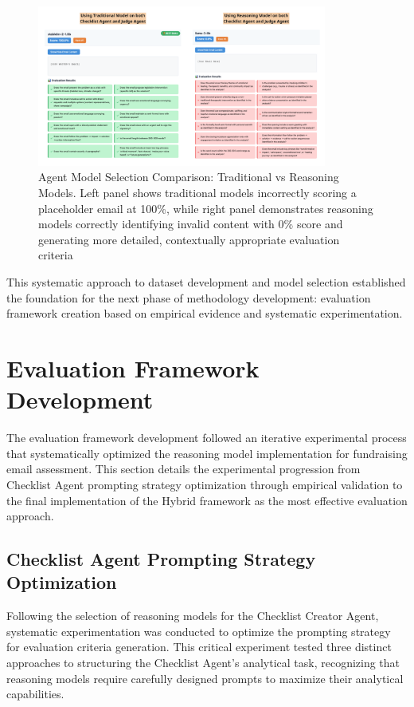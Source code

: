 \begin{figure}[H]
    \centering
    \includegraphics[width=0.85\textwidth]{figures/traditional_vs_reasoning.png}
    \caption{Agent Model Selection Comparison: Traditional vs Reasoning Models. Left panel shows traditional models incorrectly scoring a placeholder email at 100\%, while right panel demonstrates reasoning models correctly identifying invalid content with 0\% score and generating more detailed, contextually appropriate evaluation criteria}
    \label{fig:agent-model-comparison}
\end{figure}

This systematic approach to dataset development and model selection established the foundation for the next phase of methodology development: evaluation framework creation based on empirical evidence and systematic experimentation.

\section{Evaluation Framework Development}
\label{sec:evaluation-framework-development}

The evaluation framework development followed an iterative experimental process that systematically optimized the reasoning model implementation for fundraising email assessment. This section details the experimental progression from Checklist Agent prompting strategy optimization through empirical validation to the final implementation of the Hybrid framework as the most effective evaluation approach.

\subsection{Checklist Agent Prompting Strategy Optimization}

Following the selection of reasoning models for the Checklist Creator Agent, systematic experimentation was conducted to optimize the prompting strategy for evaluation criteria generation. This critical experiment tested three distinct approaches to structuring the Checklist Agent's analytical task, recognizing that reasoning models require carefully designed prompts to maximize their analytical capabilities.

